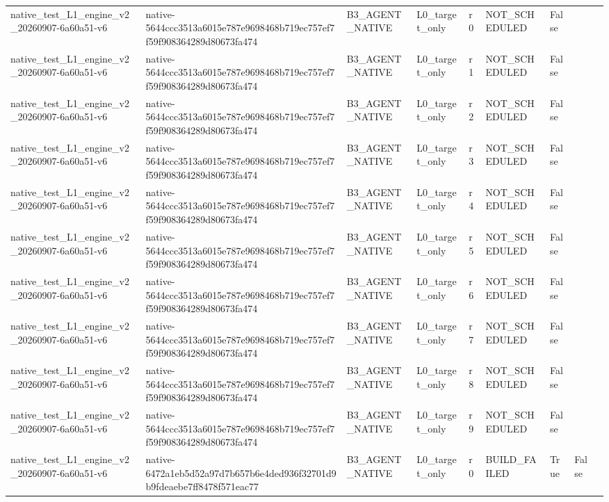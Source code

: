 \begin{tabular}{lllllllll}
native\_test\_L1\_engine\_v2\_20260907-6a60a51-v6 & native-5644ccc3513a6015e787e9698468b719ec757ef7f59f908364289d80673fa474 & B3\_AGENT\_NATIVE & L0\_target\_only & r0 & NOT\_SCHEDULED & False &  &  \\
native\_test\_L1\_engine\_v2\_20260907-6a60a51-v6 & native-5644ccc3513a6015e787e9698468b719ec757ef7f59f908364289d80673fa474 & B3\_AGENT\_NATIVE & L0\_target\_only & r1 & NOT\_SCHEDULED & False &  &  \\
native\_test\_L1\_engine\_v2\_20260907-6a60a51-v6 & native-5644ccc3513a6015e787e9698468b719ec757ef7f59f908364289d80673fa474 & B3\_AGENT\_NATIVE & L0\_target\_only & r2 & NOT\_SCHEDULED & False &  &  \\
native\_test\_L1\_engine\_v2\_20260907-6a60a51-v6 & native-5644ccc3513a6015e787e9698468b719ec757ef7f59f908364289d80673fa474 & B3\_AGENT\_NATIVE & L0\_target\_only & r3 & NOT\_SCHEDULED & False &  &  \\
native\_test\_L1\_engine\_v2\_20260907-6a60a51-v6 & native-5644ccc3513a6015e787e9698468b719ec757ef7f59f908364289d80673fa474 & B3\_AGENT\_NATIVE & L0\_target\_only & r4 & NOT\_SCHEDULED & False &  &  \\
native\_test\_L1\_engine\_v2\_20260907-6a60a51-v6 & native-5644ccc3513a6015e787e9698468b719ec757ef7f59f908364289d80673fa474 & B3\_AGENT\_NATIVE & L0\_target\_only & r5 & NOT\_SCHEDULED & False &  &  \\
native\_test\_L1\_engine\_v2\_20260907-6a60a51-v6 & native-5644ccc3513a6015e787e9698468b719ec757ef7f59f908364289d80673fa474 & B3\_AGENT\_NATIVE & L0\_target\_only & r6 & NOT\_SCHEDULED & False &  &  \\
native\_test\_L1\_engine\_v2\_20260907-6a60a51-v6 & native-5644ccc3513a6015e787e9698468b719ec757ef7f59f908364289d80673fa474 & B3\_AGENT\_NATIVE & L0\_target\_only & r7 & NOT\_SCHEDULED & False &  &  \\
native\_test\_L1\_engine\_v2\_20260907-6a60a51-v6 & native-5644ccc3513a6015e787e9698468b719ec757ef7f59f908364289d80673fa474 & B3\_AGENT\_NATIVE & L0\_target\_only & r8 & NOT\_SCHEDULED & False &  &  \\
native\_test\_L1\_engine\_v2\_20260907-6a60a51-v6 & native-5644ccc3513a6015e787e9698468b719ec757ef7f59f908364289d80673fa474 & B3\_AGENT\_NATIVE & L0\_target\_only & r9 & NOT\_SCHEDULED & False &  &  \\
native\_test\_L1\_engine\_v2\_20260907-6a60a51-v6 & native-6472a1eb5d52a97d7b657b6e4ded936f32701d9b9fdeaebe7ff8478f571eac77 & B3\_AGENT\_NATIVE & L0\_target\_only & r0 & BUILD\_FAILED & True & False &  \\

\end{tabular}
